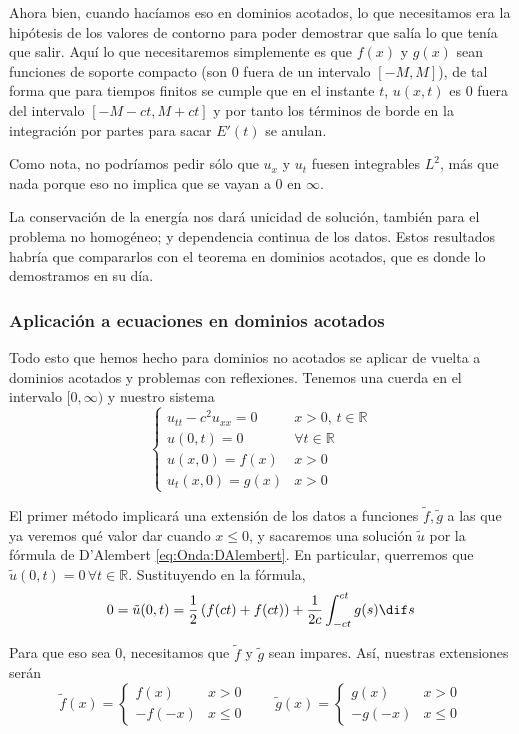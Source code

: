 		Ahora bien, cuando hacíamos eso en dominios acotados, lo que necesitamos era la hipótesis de los valores de contorno para poder demostrar que salía lo que tenía que salir. Aquí lo que necesitaremos simplemente es que $f(x)$ y $g(x)$ sean funciones de soporte compacto (son $0$ fuera de un intervalo $[-M, M]$), de tal forma que para tiempos finitos se cumple que en el instante $t$, $u(x,t)$ es $0$ fuera del intervalo $[-M - ct, M + ct]$ y por tanto los términos de borde en la integración por partes para sacar $E'(t)$ se anulan.

		Como nota, no podríamos pedir sólo que $u_x$ y $u_t$ fuesen integrables $L^2$, más que nada porque eso no implica que se vayan a $0$ en $∞$.

		La conservación de la energía nos dará unicidad de solución, también para el problema no homogéneo; y dependencia continua de los datos. Estos resultados habría que compararlos con el teorema en dominios acotados, que es donde lo demostramos en su día.

		\subsubsection{Aplicación a ecuaciones en dominios acotados}

		Todo esto que hemos hecho para dominios no acotados se aplicar de vuelta a dominios acotados y problemas con reflexiones. Tenemos una cuerda en el intervalo $[0, ∞)$ y nuestro sistema \[ \begin{cases}
		u_{tt} - c^2u_{xx} = 0 & x > 0,\, t ∈ ℝ \\
		u(0,t) = 0 & ∀ t ∈ ℝ \\
		u(x,0) = f(x) & x > 0 \\
		u_t(x,0) = g(x) & x > 0
		\end{cases}\]

		El primer método implicará una extensión de los datos a funciones $\tilde{f}, \tilde{g}$ a las que ya veremos qué valor dar cuando $x ≤ 0$, y sacaremos una solución $\tilde{u}$ por la fórmula de D'Alembert \eqref{eq:Onda:DAlembert}. En particular, querremos que $\tilde{u}(0,t) = 0\,∀t ∈ ℝ$. Sustituyendo en la fórmula, \[ 0 = \tilde{u}(0,t) = \frac{1}{2} \left(f(ct) + f(ct)\right) + \frac{1}{2c} \int_{-ct}^{ct} g(s) \dif s \]

		Para que eso sea 0, necesitamos que $\tilde{f}$ y $\tilde{g}$ sean impares. Así, nuestras extensiones serán \[
		\tilde{f}(x) = \begin{cases}
		f(x) & x > 0 \\
		-f(-x) & x ≤ 0
		\end{cases} \qquad
		\tilde{g}(x) = \begin{cases}
		g(x) & x > 0 \\
		-g(-x) & x ≤ 0
		\end{cases}
		\]

